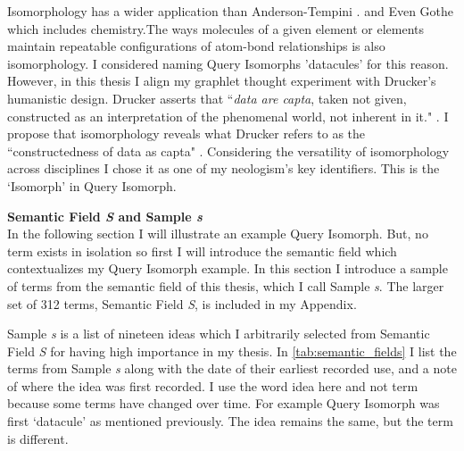 Isomorphology has a wider application than Anderson-Tempini \citep{anderson_drawing_2018}. and Even Gothe \citep[p. 11]{anderson_drawing_2018} which includes chemistry.The ways molecules of a given element or elements maintain repeatable configurations of atom-bond relationships is also isomorphology. I considered naming Query Isomorphs 'datacules' for this reason. However, in this thesis I align my graphlet thought experiment with Drucker's humanistic design. Drucker asserts that ``\textit{data are capta}, taken not given, constructed as an interpretation of the phenomenal world, not inherent in it." \citep[p. 128]{drucker_graphesis_2014}. I propose that isomorphology reveals what Drucker refers to as the ``constructedness of data as capta" \citep[p. 128]{drucker_graphesis_2014}. Considering the versatility of isomorphology across disciplines I chose it as one of my neologism’s key identifiers. This is the ‘Isomorph’ in Query Isomorph.

\noindent \textbf{Semantic Field \textit{S} and Sample \textit{s}}
\\
In the following section I will illustrate an example Query Isomorph. But, no term exists in isolation so first I will introduce the semantic field \citep[p. 107]{jurafsky_speech_2024} which contextualizes my Query Isomorph example. In this section I introduce a sample of terms from the semantic field of this thesis, which I call Sample \textit{s}. The larger set of 312 terms, Semantic Field \textit{S}, is included in my Appendix.


Sample \textit{s} is a list of nineteen ideas which I arbitrarily selected from Semantic Field \textit{S} for having high importance in my thesis. In \autoref{tab:semantic_fields} I list the terms from Sample \textit{s} along with the date of their earliest recorded use, and a note of where the idea was first recorded. I use the word idea here and not term because some terms have changed over time. For example Query Isomorph was first ‘datacule’ as mentioned previously. The idea remains the same, but the term is different. 



